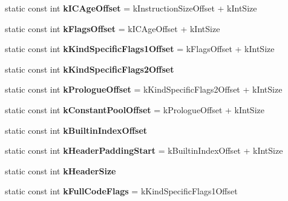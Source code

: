 \begin{DoxyCompactItemize}
\item 
static const int {\bfseries k\+I\+C\+Age\+Offset} = k\+Instruction\+Size\+Offset + k\+Int\+Size\hypertarget{classv8_1_1internal_1_1_code_ace642a40217f211270408faf1790f7f2}{}\label{classv8_1_1internal_1_1_code_ace642a40217f211270408faf1790f7f2}

\item 
static const int {\bfseries k\+Flags\+Offset} = k\+I\+C\+Age\+Offset + k\+Int\+Size\hypertarget{classv8_1_1internal_1_1_code_a23fd16742a1176874d656c92b7ae7508}{}\label{classv8_1_1internal_1_1_code_a23fd16742a1176874d656c92b7ae7508}

\item 
static const int {\bfseries k\+Kind\+Specific\+Flags1\+Offset} = k\+Flags\+Offset + k\+Int\+Size\hypertarget{classv8_1_1internal_1_1_code_a4e602360adfc0e3ef37632b9931a67e8}{}\label{classv8_1_1internal_1_1_code_a4e602360adfc0e3ef37632b9931a67e8}

\item 
static const int {\bfseries k\+Kind\+Specific\+Flags2\+Offset}
\item 
static const int {\bfseries k\+Prologue\+Offset} = k\+Kind\+Specific\+Flags2\+Offset + k\+Int\+Size\hypertarget{classv8_1_1internal_1_1_code_a8fb13656a444b42f2cd723b2cf8cbbae}{}\label{classv8_1_1internal_1_1_code_a8fb13656a444b42f2cd723b2cf8cbbae}

\item 
static const int {\bfseries k\+Constant\+Pool\+Offset} = k\+Prologue\+Offset + k\+Int\+Size\hypertarget{classv8_1_1internal_1_1_code_a52c00f1abff6940d618ed458c322f113}{}\label{classv8_1_1internal_1_1_code_a52c00f1abff6940d618ed458c322f113}

\item 
static const int {\bfseries k\+Builtin\+Index\+Offset}
\item 
static const int {\bfseries k\+Header\+Padding\+Start} = k\+Builtin\+Index\+Offset + k\+Int\+Size\hypertarget{classv8_1_1internal_1_1_code_a84ec3741772ff38c7efa6001523ff3b8}{}\label{classv8_1_1internal_1_1_code_a84ec3741772ff38c7efa6001523ff3b8}

\item 
static const int {\bfseries k\+Header\+Size}
\item 
static const int {\bfseries k\+Full\+Code\+Flags} = k\+Kind\+Specific\+Flags1\+Offset\hypertarget{classv8_1_1internal_1_1_code_ad599b35e9cb80eaaea242597f5799a07}{}\label{classv8_1_1internal_1_1_code_ad599b35e9cb80eaaea242597f5799a07}


\end{DoxyCompactItemize}
